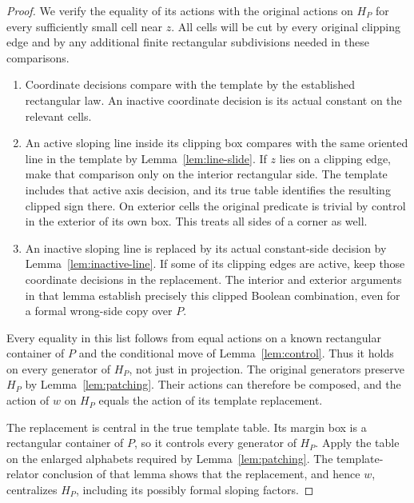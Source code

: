 \begin{proof}
We verify the equality of its actions with the original
actions on $H_P$ for every sufficiently small cell near $z$.
All cells will be cut by every original clipping edge and
by any additional finite rectangular subdivisions needed
in these comparisons.
\begin{enumerate}[label=(\roman*)]
\item Coordinate decisions compare with the template by
the established rectangular law.  An inactive coordinate
decision is its actual constant on the relevant cells.
\item An active sloping line inside its clipping box
compares with the same oriented line in the template by
Lemma~\ref{lem:line-slide}.  If $z$ lies on a clipping edge,
make that comparison only on the interior rectangular
side.  The template includes that active axis decision,
and its true table identifies the resulting clipped sign
there.  On exterior cells the original predicate is
trivial by control in the exterior of its own box.
This treats all sides of a corner as well.
\item An inactive sloping line is replaced by its actual
constant-side decision by Lemma~\ref{lem:inactive-line}.
If some of its clipping edges are active, keep those
coordinate decisions in the replacement.  The interior
and exterior arguments in that lemma establish precisely
this clipped Boolean combination, even for a formal
wrong-side copy over $P$.
\end{enumerate}
Every equality in this list follows from equal actions on
a known rectangular container of $P$ and the conditional
move of Lemma~\ref{lem:control}.  Thus it holds on every
generator of $H_P$, not just in projection.  The original
generators preserve $H_P$ by Lemma~\ref{lem:patching}.  Their actions
can therefore be composed, and the action of $w$ on $H_P$
equals the action of its template replacement.

The replacement is central in the true template table.
Its margin box is a rectangular container of $P$, so it
controls every generator of $H_P$.  Apply the table on the
enlarged alphabets required by Lemma~\ref{lem:patching}.
The template-relator conclusion of that lemma shows that
the replacement, and hence $w$, centralizes $H_P$, including
its possibly formal sloping factors.


\end{proof}
